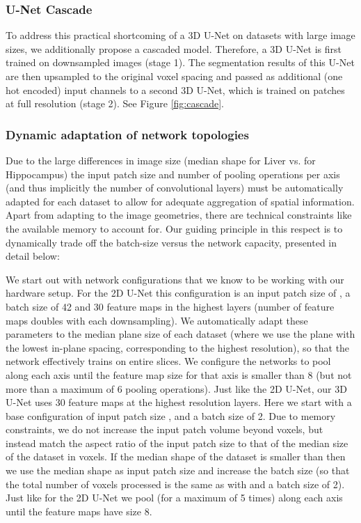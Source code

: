 \documentclass{templates/llncs}
\begin{document}
    \subsubsection{U-Net Cascade}
    To address this practical shortcoming of a 3D U-Net on datasets with large image sizes, we additionally propose a cascaded model. Therefore, a 3D U-Net is first trained on downsampled images (stage 1). The segmentation results of this U-Net are then upsampled to the original voxel spacing and passed as additional (one hot encoded) input channels to a second 3D U-Net, which is trained on patches at full resolution (stage 2). See Figure \ref{fig:cascade}.
    
    \subsubsection{Dynamic adaptation of network topologies}
    Due to the large differences in image size (median shape  for Liver vs.  for Hippocampus) the input patch size and number of pooling operations per axis (and thus implicitly the number of convolutional layers) must be automatically adapted for each dataset to allow for adequate aggregation of spatial information. Apart from adapting to the image geometries, there are technical constraints like the available memory to account for. Our guiding principle in this respect is to dynamically trade off the batch-size versus the network capacity, presented in detail below:
    
    We start out with network configurations that we know to be working with our hardware setup. For the 2D U-Net this configuration is an input patch size of , a batch size of 42 and 30 feature maps in the highest layers (number of feature maps doubles with each downsampling). We automatically adapt these parameters to the median plane size of each dataset (where we use the plane with the lowest in-plane spacing, corresponding to the highest resolution), so that the network effectively trains on entire slices. We configure the networks to pool along each axis until the feature map size for that axis is smaller than 8 (but not more than a maximum of 6 pooling operations). 
    Just like the 2D U-Net, our 3D U-Net uses 30 feature maps at the highest resolution layers. Here we start with a base configuration of input patch size , and a batch size of 2. Due to memory constraints, we do not increase the input patch volume beyond  voxels, but instead match the aspect ratio of the input patch size to that of the median size of the dataset in voxels. If the median shape of the dataset is smaller than  then we use the median shape as input patch size and increase the batch size (so that the total number of voxels processed is the same as with  and a batch size of 2). Just like for the 2D U-Net we pool (for a maximum of 5 times) along each axis until the feature maps have size 8.
    
\end{document}
